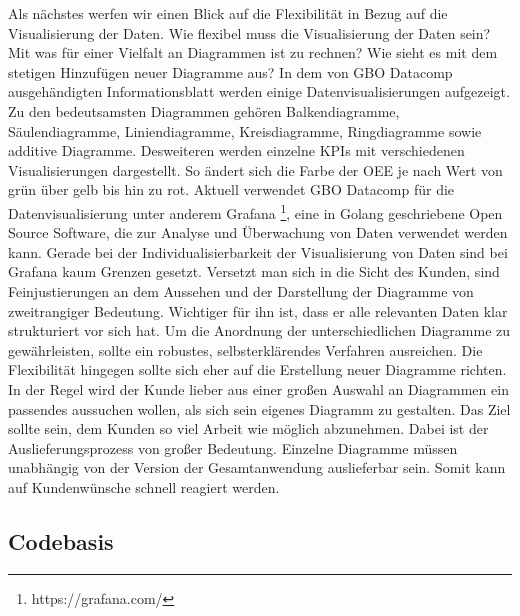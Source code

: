 Als nächstes werfen wir einen Blick auf die Flexibilität in Bezug auf die Visualisierung der Daten. Wie flexibel
muss die Visualisierung der Daten sein? Mit was für einer Vielfalt an Diagrammen ist zu rechnen? Wie sieht es
mit dem stetigen Hinzufügen neuer Diagramme aus? In dem von GBO Datacomp ausgehändigten Informationsblatt
werden einige Datenvisualisierungen aufgezeigt. Zu den bedeutsamsten Diagrammen gehören Balkendiagramme,
Säulendiagramme, Liniendiagramme, Kreisdiagramme, Ringdiagramme sowie additive Diagramme. Desweiteren werden
einzelne KPIs mit verschiedenen Visualisierungen dargestellt. So ändert sich die Farbe der OEE je nach
Wert von grün über gelb bis hin zu rot. Aktuell verwendet GBO Datacomp für die Datenvisualisierung unter
anderem Grafana \footnote{https://grafana.com/}, eine in Golang geschriebene Open Source Software, die zur Analyse
und Überwachung von Daten verwendet werden kann. Gerade bei der Individualisierbarkeit der Visualisierung
von Daten sind bei Grafana kaum Grenzen gesetzt. Versetzt man sich in die Sicht des Kunden, sind Feinjustierungen
an dem Aussehen und der Darstellung der Diagramme von zweitrangiger Bedeutung. Wichtiger für ihn ist, dass
er alle relevanten Daten klar strukturiert vor sich hat. Um die Anordnung der unterschiedlichen Diagramme
zu gewährleisten, sollte ein robustes, selbsterklärendes Verfahren ausreichen. Die Flexibilität hingegen
sollte sich eher auf die Erstellung neuer Diagramme richten. In der Regel wird der Kunde lieber aus einer
großen Auswahl an Diagrammen ein passendes aussuchen wollen, als sich sein eigenes Diagramm zu gestalten.
Das Ziel sollte sein, dem Kunden so viel Arbeit wie möglich abzunehmen. Dabei ist der Auslieferungsprozess
von großer Bedeutung. Einzelne Diagramme müssen unabhängig von der Version der Gesamtanwendung auslieferbar
sein. Somit kann auf Kundenwünsche schnell reagiert werden.

\subsection{Codebasis}
\label{subsec:codebasis}



